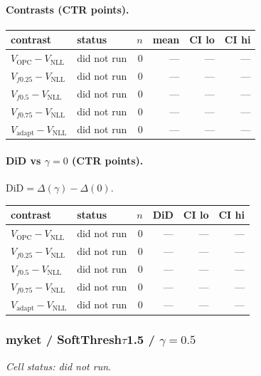 \documentclass[10pt,a4paper]{article}
\begin{document}
\paragraph{Contrasts (CTR points).}
{\centering\small\begin{tabular}{llrrrr}
\toprule contrast & status & $n$ & mean & CI lo & CI hi \\
\midrule
$V_{\mathrm{OPC}}-V_{\mathrm{NLL}}$ & did not run & 0 & --- & --- & --- \\
$V_{f0.25}-V_{\mathrm{NLL}}$ & did not run & 0 & --- & --- & --- \\
$V_{f0.5}-V_{\mathrm{NLL}}$ & did not run & 0 & --- & --- & --- \\
$V_{f0.75}-V_{\mathrm{NLL}}$ & did not run & 0 & --- & --- & --- \\
$V_{\mathrm{adapt}}-V_{\mathrm{NLL}}$ & did not run & 0 & --- & --- & --- \\
\bottomrule\end{tabular}\par}
\paragraph{DiD vs $\gamma=0$ (CTR points).} $\mathrm{DiD}=\Delta(\gamma)-\Delta(0)$.
{\centering\small\begin{tabular}{llrrrr}
\toprule contrast & status & $n$ & DiD & CI lo & CI hi \\
\midrule
$V_{\mathrm{OPC}}-V_{\mathrm{NLL}}$ & did not run & 0 & --- & --- & --- \\
$V_{f0.25}-V_{\mathrm{NLL}}$ & did not run & 0 & --- & --- & --- \\
$V_{f0.5}-V_{\mathrm{NLL}}$ & did not run & 0 & --- & --- & --- \\
$V_{f0.75}-V_{\mathrm{NLL}}$ & did not run & 0 & --- & --- & --- \\
$V_{\mathrm{adapt}}-V_{\mathrm{NLL}}$ & did not run & 0 & --- & --- & --- \\
\bottomrule\end{tabular}\par}
\bigskip
\subsubsection{myket / SoftThresh$\tau$1.5 / $\gamma=0.5$}
\emph{Cell status: did not run}.
\end{document}
